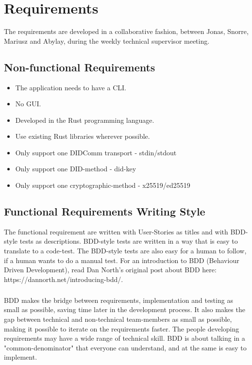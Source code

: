 \chapter{Requirements}

The requirements are developed in a collaborative fashion, between Jonas, Snorre, Mariusz and Abylay, during the weekly technical supervisor meeting.



\section{Non-functional Requirements}
\begin{itemize}
    \item The application needs to have a CLI.
    \item No GUI.
    \item Developed in the Rust programming language.
    \item Use existing Rust libraries wherever possible.
    \item Only support one DIDComm transport - stdin/stdout
    \item Only support one DID-method - did-key
    \item Only support one cryptographic-method - x25519/ed25519
\end{itemize}



\section{Functional Requirements Writing Style}

The functional requirement are written with User-Stories as titles and with BDD-style tests as descriptions. BDD-style tests are written in a way that is easy to translate to a code-test. The BDD-style tests are also easy for a human to follow, if a human wants to do a manual test. For an introduction to BDD (Behaviour Driven Development), read Dan North's original post about BDD here: https://dannorth.net/introducing-bdd/.

\paragraph{}
BDD makes the bridge between requirements, implementation and testing as small as possible, saving time later in the development process. It also makes the gap between technical and non-technical team-members as small as possible, making it possible to iterate on the requirements faster. The people developing requirements may have a wide range of technical skill. BDD is about talking in a "common-denominator" that everyone can understand, and at the same is easy to implement.



